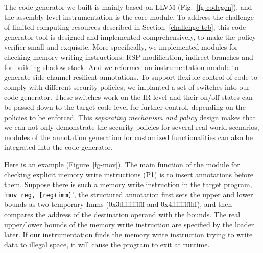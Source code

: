 The code generator we built is mainly based on LLVM (Fig.~\ref{fg-codegen}), and the assembly-level instrumentation is the core module. To address the challenge of limited computing resources described in Section~\ref{challenge-tcb}, this code generator tool is designed and implemented comprehensively, to make the policy verifier small and exquisite. More specifically, we implemented modules for checking memory writing instructions, RSP modification, indirect branches and for building shadow stack. And we reformed an instrumentation module to generate side-channel-resilient annotations. 
To support flexible control of code to comply with different security policies, we implanted a set of switches into our code generator. These switches work on the IR level and their on/off states can be passed down to the target code level for further control, depending on the policies to be enforced. This \textit{separating mechanism and policy} design makes that we can not only demonstrate the security policies for several real-world scenarios, modules of the annotation generation for customized functionalities can also be integrated into the code generator.
 

Here is an example (Figure~\ref{fg-mov}). The main function of the module for checking explicit memory write instructions (P1) is to insert annotations before them. Suppose there is such a memory write instruction in the target program, `\texttt{mov reg, [reg+imm]}',
the structured annotation first sets the upper and lower bounds as two temporary Imms (0x3ffffffffffff and 0x4ffffffffffff), and then compares the address of the destination operand with the bounds. The real upper/lower bounds of the memory write instruction are specified by the loader later. If our instrumentation finds the memory write instruction trying to write data to illegal space, it will cause the program to exit at runtime. 








